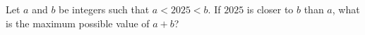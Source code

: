 Let $a$ and $b$ be integers such that $a < 2025 < b$. If $2025$ is closer to $b$ than $a$, what is the maximum possible value of $a + b$?
